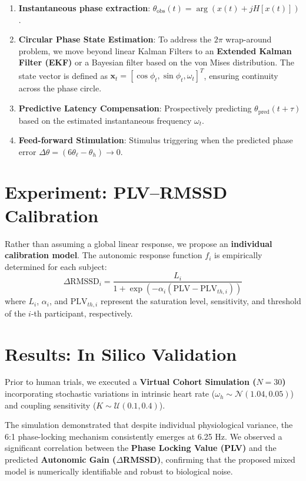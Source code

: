 \documentclass[fleqn,10pt]{article}
\begin{document}
\begin{enumerate}
    \item \textbf{Instantaneous phase extraction}: $\theta_{\text{obs}}(t)=\arg(x(t)+jH[x(t)])$.
    \item \textbf{Circular Phase State Estimation}: To address the $2\pi$ wrap-around problem, we move beyond linear Kalman Filters to an \textbf{Extended Kalman Filter (EKF)} or a Bayesian filter based on the von Mises distribution. The state vector is defined as $\mathbf{x}_t = [\cos \phi_t, \sin \phi_t, \omega_t]^T$, ensuring continuity across the phase circle.
    \item \textbf{Predictive Latency Compensation}: Prospectively predicting $\theta_{\text{pred}}(t+\tau)$ based on the estimated instantaneous frequency $\omega_t$.
    \item \textbf{Feed-forward Stimulation}: Stimulus triggering when the predicted phase error $\Delta \theta = (6\theta_\ell - \theta_h) \to 0$.
\end{enumerate}

\section{Experiment: PLV--RMSSD Calibration}
Rather than assuming a global linear response, we propose an \textbf{individual calibration model}. The autonomic response function $f_i$ is empirically determined for each subject:
\begin{equation}
\Delta\text{RMSSD}_i = \frac{L_i}{1 + \exp(-\alpha_i(\text{PLV} - \text{PLV}_{th,i}))}
\end{equation}
where $L_i$, $\alpha_i$, and $\text{PLV}_{th,i}$ represent the saturation level, sensitivity, and threshold of the $i$-th participant, respectively.

\section{Results: In Silico Validation}
Prior to human trials, we executed a \textbf{Virtual Cohort Simulation ($N=30$)} incorporating stochastic variations in intrinsic heart rate ($\omega_h \sim \mathcal{N}(1.04, 0.05)$) and coupling sensitivity ($K \sim \mathcal{U}(0.1, 0.4)$). 

The simulation demonstrated that despite individual physiological variance, the 6:1 phase-locking mechanism consistently emerges at 6.25 Hz. We observed a significant correlation between the \textbf{Phase Locking Value (PLV)} and the predicted \textbf{Autonomic Gain ($\Delta$RMSSD)}, confirming that the proposed mixed model is numerically identifiable and robust to biological noise.
\end{document}
